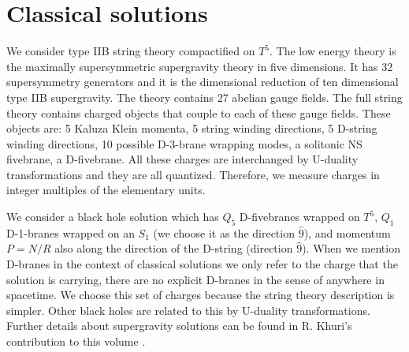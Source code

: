 \section{Classical solutions}

We  consider type IIB string theory compactified on $T^5$.
The low energy theory is the maximally supersymmetric supergravity
theory in five dimensions. It has 32 supersymmetry generators and
it is the dimensional reduction of ten dimensional type IIB
supergravity. 
The theory contains 27 abelian gauge fields. The full string 
theory contains charged objects  that couple to each of these 
gauge fields. These objects are: 5 Kaluza Klein momenta, 5 string
winding directions, 5 D-string winding directions, 10 possible
D-3-brane wrapping modes, a solitonic NS fivebrane, a D-fivebrane.
All these charges are interchanged by U-duality transformations
\cite{hull}
and they
are all quantized.
Therefore,
 we measure charges in integer   multiples of the elementary units.

We consider a black hole solution which has $Q_5$ D-fivebranes
wrapped on $T^5$, $Q_1$ D-1-branes wrapped on an $S_1$ (we choose
it as the direction $\hat 9$), and momentum  $P = N/R$ also 
along the direction of the D-string (direction $\hat 9$).
When we mention D-branes in the context of classical
solutions
we only refer to the charge that the solution is carrying, there
are no explicit D-branes in the sense of \cite{daipol,polchinski}
anywhere in spacetime. 
We choose this set of charges because the string theory description
is simpler. Other black holes are related to this by U-duality
transformations. Further details about supergravity solutions
can be found in R. Khuri's contribution to this volume
\cite{khuripoland}.

